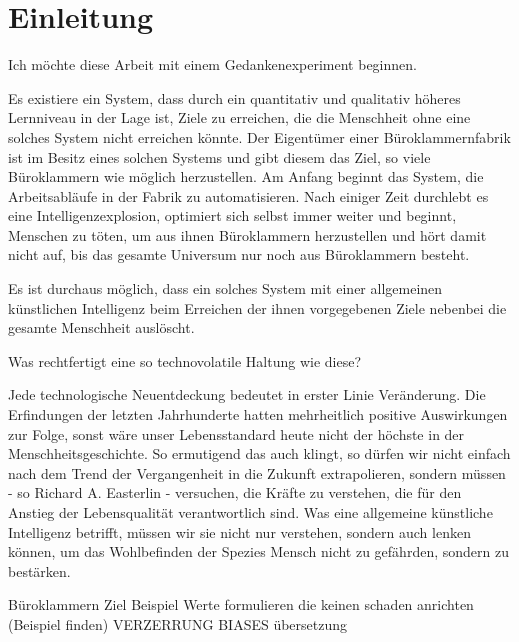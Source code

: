 \chapter{Einleitung}

Ich möchte diese Arbeit mit einem Gedankenexperiment beginnen.

Es existiere ein System, dass durch ein quantitativ und qualitativ höheres Lernniveau in der Lage ist, Ziele zu erreichen, die die Menschheit ohne eine solches System nicht erreichen könnte. Der Eigentümer einer Büroklammernfabrik ist im Besitz eines solchen Systems und gibt diesem das Ziel, so viele Büroklammern wie möglich herzustellen. Am Anfang beginnt das System, die Arbeitsabläufe in der Fabrik zu automatisieren. Nach einiger Zeit durchlebt es eine Intelligenzexplosion, optimiert sich selbst immer weiter und beginnt, Menschen zu töten, um aus ihnen Büroklammern herzustellen und hört damit nicht auf, bis das gesamte Universum nur noch aus Büroklammern besteht. 

Es ist durchaus möglich, dass ein solches System mit einer allgemeinen künstlichen Intelligenz beim Erreichen der ihnen vorgegebenen Ziele nebenbei die gesamte Menschheit auslöscht.

Was rechtfertigt eine so technovolatile Haltung wie diese?


Jede technologische Neuentdeckung bedeutet in erster Linie Veränderung. Die Erfindungen der letzten Jahrhunderte hatten mehrheitlich positive Auswirkungen zur Folge, sonst wäre unser Lebensstandard heute nicht der höchste in der Menschheitsgeschichte. So ermutigend das auch klingt, so dürfen wir nicht einfach nach dem Trend der Vergangenheit in die Zukunft extrapolieren, sondern müssen - so Richard A. Easterlin - versuchen, die Kräfte zu verstehen, die für den Anstieg der Lebensqualität verantwortlich sind.  Was eine allgemeine künstliche Intelligenz betrifft, müssen wir sie nicht nur verstehen, sondern auch lenken können, um das Wohlbefinden der Spezies Mensch nicht zu gefährden, sondern zu bestärken.

Büroklammern Ziel Beispiel
Werte formulieren die keinen schaden anrichten (Beispiel finden)
VERZERRUNG BIASES übersetzung

